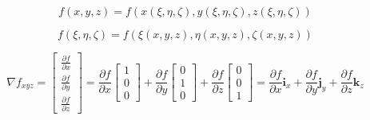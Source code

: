 \documentclass
[
a4paper,                      %
twoside,					  %
12pt,                         %
abstract,		      %
fleqn,                        %
]
{scrartcl} %
\begin{document}
\begin{equation}
f\left(x,y,z\right)=f\left(x\left(\xi,\eta,\zeta\right),y\left(\xi,\eta,\zeta\right),z\left(\xi,\eta,\zeta\right)\right)
\end{equation}

\begin{equation}
f\left(\xi,\eta,\zeta\right)=f\left(\xi\left(x,y,z\right),\eta\left(x,y,z\right),\zeta\left(x,y,z\right)\right)
\end{equation}

\begin{equation}
\nabla f_{xyz}=\begin{bmatrix}
\frac{\partial f}{\partial x}\\[5pt]
\frac{\partial f}{\partial y}\\[5pt]
\frac{\partial f}{\partial z}
\end{bmatrix}=\frac{\partial f}{\partial x}\begin{bmatrix}
1\\[5pt]
0\\[5pt]
0
\end{bmatrix}+\frac{\partial f}{\partial y}\begin{bmatrix}
0\\[5pt]
1\\[5pt]
0
\end{bmatrix}+\frac{\partial f}{\partial z}\begin{bmatrix}
0\\[5pt]
0\\[5pt]
1
\end{bmatrix}=\frac{\partial f}{\partial x}\mathbf{i}_{x}+\frac{\partial f}{\partial y}\mathbf{j}_{y}+\frac{\partial f}{\partial z}\mathbf{k}_{z}
\end{equation}
\end{document}
